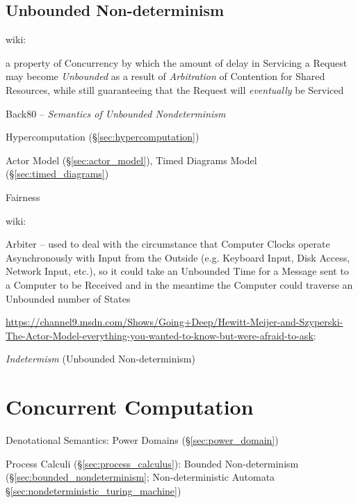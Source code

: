 \subsection{Unbounded Non-determinism}
\label{sec:unbounded_nondeterminism}

wiki:

a property of Concurrency by which the amount of delay in Servicing a
Request may become \emph{Unbounded} as a result of \emph{Arbitration}
of Contention for Shared Resources, while still guaranteeing that the
Request will \emph{eventually} be Serviced

Back80 -- \emph{Semantics of Unbounded Nondeterminism}

\fist Hypercomputation (\S\ref{sec:hypercomputation})

\fist Actor Model (\S\ref{sec:actor_model}), Timed Diagrams Model
(\S\ref{sec:timed_diagrams})

Fairness

wiki:

Arbiter -- used to deal with the circumstance that Computer Clocks
operate Asynchronously with Input from the Outside (e.g. Keyboard
Input, Disk Access, Network Input, etc.), so it could take an
Unbounded Time for a Message sent to a Computer to be Received and in
the meantime the Computer could traverse an Unbounded number of States


\url{https://channel9.msdn.com/Shows/Going+Deep/Hewitt-Meijer-and-Szyperski-The-Actor-Model-everything-you-wanted-to-know-but-were-afraid-to-ask}:

\emph{Indetermism} (Unbounded Non-determinism)



\section{Concurrent Computation}\label{sec:concurrent_computation}

Denotational Semantics: Power Domains (\S\ref{sec:power_domain})

\fist Process Calculi (\S\ref{sec:process_calculus}): Bounded
Non-determinism (\S\ref{sec:bounded_nondeterminism}; \fist
Non-deterministic Automata \S\ref{sec:nondeterministic_turing_machine})

